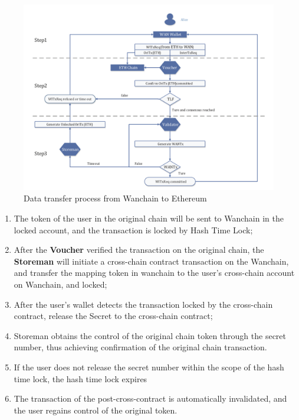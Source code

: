         \begin{figure}[H]
        \includegraphics[width=1\textwidth]{./figures/wantoeth.png}
        \centering
        \caption{{Data transfer process from Wanchain to Ethereum}\protect\footnotemark}
        \centering
        \label{fig:wan2}
        
        \end{figure}

\begin{enumerate}
    \item The token of the user in the original chain will be sent to Wanchain in the locked account, and the transaction is locked by Hash Time Lock;
    \item After the \textbf{Voucher} verified  the transaction on the original chain, the \textbf{Storeman} will initiate a cross-chain contract transaction on the Wanchain, and transfer the mapping token in wanchain to the user's cross-chain account on Wanchain, and locked;
    \item After the user's wallet detects the transaction locked by the cross-chain contract, release the Secret to the cross-chain contract;
    \item Storeman obtains the control of the original chain token through the secret number, thus achieving confirmation of the original chain transaction.
    \item If the user does not release the secret number within the scope of the hash time lock, the hash time lock expires
    \item The transaction of the post-cross-contract is automatically invalidated, and the user regains control of the original token.
\end{enumerate}

